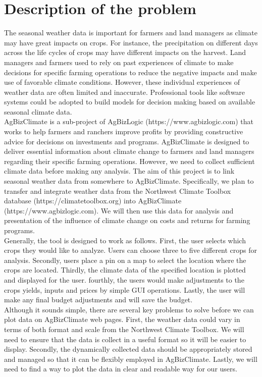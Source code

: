 \documentclass[letterpaper,10pt]{article}
\begin{document}
    \section*{Description of the problem}
    The seasonal weather data is important for farmers and land managers as climate may have great impacts on crops. For instance, the precipitation on different days across the life cycles of crops may have different impacts on the harvest. Land managers and farmers used to rely on past experiences of climate to make decisions for specific farming operations to reduce the negative impacts and make use of favorable climate conditions. However, these individual experiences of weather data are often limited and inaccurate. Professional tools like software systems could be adopted to build models for decision making based on available seasonal climate data.\\
    
    AgBizClimate is a sub-project of AgBizLogic (https://www.agbizlogic.com) that works to help farmers and ranchers improve profits by providing constructive advice for decisions on investments and programs. AgBizClimate is designed to deliver essential information about climate change to farmers and land managers regarding their specific farming operations. However, we need to collect sufficient climate data before making any analysis. The aim of this project is to link seasonal weather data from somewhere to AgBizClimate. Specifically, we plan to transfer and integrate weather data from the Northwest Climate Toolbox database (https://climatetoolbox.org) into AgBizClimate (https://www.agbizlogic.com). We will then use this data for analysis and presentation of the influence of climate change on costs and returns for farming programs.\\
    
    Generally, the tool is designed to work as follows. First, the user selects which crops they would like to analyze. Users can choose three to five different crops for analysis. Secondly, users place a pin on a map to select the location where the crops are located. Thirdly, the climate data of the specified location is plotted and displayed for the user. fourthly, the users would make adjustments to the crops yields, inputs and prices by simple GUI operations. Lastly, the user will make any final budget adjustments and will save the budget.\\
    
    Although it sounds simple, there are several key problems to solve before we can plot data on AgBizClimate web pages. First, the weather data could vary in terms of both format and scale from the Northwest Climate Toolbox. We will need to ensure that the data is collect in a useful format so it will be easier to display. Secondly, the dynamically collected data should be appropriately stored and managed so that it can be flexibly employed in AgBizClimate. Lastly, we will need to find a way to plot the data in clear and readable way for our users.
\end{document}
